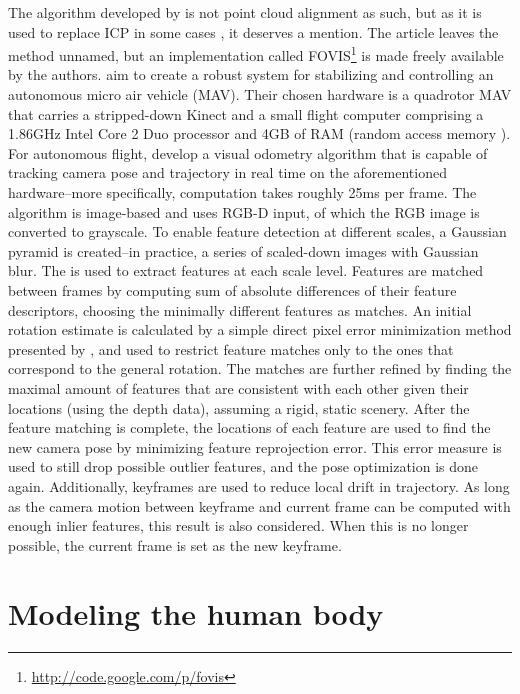 The algorithm developed by \citet{huang2011visual} is not point cloud alignment as such, but as it is used to replace ICP in some cases \citep{Whelan12rssw}, it deserves a mention. The article leaves the method unnamed, but an implementation called FOVIS\footnote{\url{http://code.google.com/p/fovis}} is made freely available by the authors. \citet{huang2011visual} aim to create a robust system for stabilizing and controlling an autonomous micro air vehicle (MAV). Their chosen hardware is a quadrotor MAV that carries a stripped-down Kinect and a small flight computer comprising a 1.86GHz Intel Core 2 Duo processor and 4GB of RAM (random access memory ). For autonomous flight, \citeauthor{huang2011visual} develop a visual odometry algorithm that is capable of tracking camera pose and trajectory in real time on the aforementioned hardware--more specifically, computation takes roughly 25ms per frame. The algorithm is image-based and uses RGB-D input, of which the RGB image is converted to grayscale. To enable feature detection at different scales, a Gaussian pyramid is created--in practice, a series of scaled-down images with Gaussian blur. The  is used to extract features at each scale level. Features are matched between frames by computing sum of absolute differences of their feature descriptors, choosing the minimally different features as matches. An initial rotation estimate is calculated by a simple direct pixel error minimization method presented by , and used to restrict feature matches only to the ones that correspond to the general rotation. The matches are further refined by finding the maximal amount of features that are consistent with each other given their locations (using the depth data), assuming a rigid, static scenery. After the feature matching is complete, the locations of each feature are used to find the new camera pose by minimizing feature reprojection error. This error measure is used to still drop possible outlier features, and the pose optimization is done again. Additionally, keyframes are used to reduce local drift in trajectory. As long as the camera motion between keyframe and current frame can be computed with enough inlier features, this result is also considered. When this is no longer possible, the current frame is set as the new keyframe. \citep{huang2011visual}


\section{Modeling the human body}


